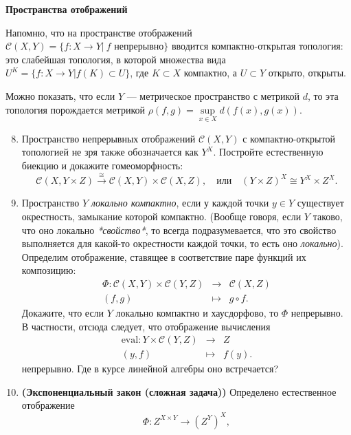 \documentclass[a4paper]{article}
\begin{document}
\begin{center}
	\large{\textbf{Пространства отображений}}
\end{center}
Напомню, что на пространстве отображений $\mathcal{C}(X,Y)=\{f\colon X\to Y|\ f\text{ непрерывно}\}$ вводится компактно-открытая топология: это слабейшая топология, в которой множества вида $U^K=\{f\colon X\to Y| f(K)\subset U\}$, где $K\subset X$ компактно, а $U\subset Y$ открыто, открыты.

{\small Можно показать, что если $Y$ --- метрическое пространство с метрикой $d$, то эта топология порождается метрикой $\rho(f,g)=\sup\limits_{x\in X} d(f(x),g(x))$.}
\begin{enumerate}
	\setcounter{enumi}{7}
	\item Пространство непрерывных отображений $\mathcal{C}(X,Y)$ с компактно-открытой топологией не зря также обозначается как $Y^X$. Постройте естественную биекцию и докажите гомеоморфность:
	\begin{equation*}
		\mathcal{C}(X,Y\times Z)\xrightarrow{\cong}\mathcal{C}(X,Y)\times\mathcal{C}(X,Z),\quad\text{или}\quad (Y\times Z)^X\cong Y^X\times Z^X.
	\end{equation*}
	\item Пространство $Y$ \textit{локально компактно}, если у каждой точки $y\in Y$ существует окрестность, замыкание которой компактно. (Вообще говоря, если $Y$ таково, что оно локально \textit{*свойство*}, то всегда подразумевается, что это свойство выполняется для какой-то окрестности каждой точки, то есть оно \textit{локально}). Определим отображение, ставящее в соответствие паре функций их композицию:
	\begin{eqnarray*}
		\Phi\colon\mathcal{C}(X,Y)\times\mathcal{C}(Y,Z)&\to&\mathcal{C}(X,Z)\\
		(f,g)&\mapsto& g\circ f.
	\end{eqnarray*}
	Докажите, что если $Y$ локально компактно и хаусдорфово, то $\Phi$ непрерывно. В частности, отсюда следует, что отображение вычисления
	\begin{eqnarray*}
		\mathrm{eval}\colon Y\times\mathcal{C}(Y,Z)&\to&Z\\
		(y,f)&\mapsto& f(y).
	\end{eqnarray*}
	непрерывно. Где в курсе линейной алгебры оно встречается?
	\item \textbf{(Экспоненциальный закон (сложная задача))} Определено естественное отображение
	\begin{equation*}
		\Phi\colon Z^{X\times Y}\to\left(Z^Y\right)^X,
	\end{equation*}

\end{enumerate}
\end{document}
